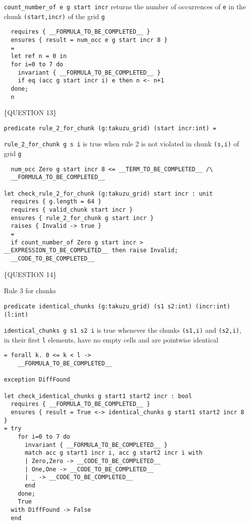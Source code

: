 \texttt{count\_number\_of\ e\ g\ start\ incr} returns the number of
occurrences of \texttt{e} in the chunk \texttt{(start,incr)} of the grid
\texttt{g}

\begin{verbatim}
  requires { __FORMULA_TO_BE_COMPLETED__ }
  ensures { result = num_occ e g start incr 8 }
  =
  let ref n = 0 in
  for i=0 to 7 do
    invariant { __FORMULA_TO_BE_COMPLETED__ }
    if eq (acc g start incr i) e then n <- n+1
  done;
  n
\end{verbatim}

\{QUESTION 13\}

\begin{verbatim}
predicate rule_2_for_chunk (g:takuzu_grid) (start incr:int) =
\end{verbatim}

\texttt{rule\_2\_for\_chunk\ g\ s\ i} is true when rule 2 is not
violated in chunk \texttt{(s,i)} of grid \texttt{g}

\begin{verbatim}
  num_occ Zero g start incr 8 <= __TERM_TO_BE_COMPLETED__ /\
  __FORMULA_TO_BE_COMPLETED__

let check_rule_2_for_chunk (g:takuzu_grid) start incr : unit
  requires { g.length = 64 }
  requires { valid_chunk start incr }
  ensures { rule_2_for_chunk g start incr }
  raises { Invalid -> true }
  =
  if count_number_of Zero g start incr > __EXPRESSION_TO_BE_COMPLETED__ then raise Invalid;
  __CODE_TO_BE_COMPLETED__
\end{verbatim}

\{QUESTION 14\}

Rule 3 for chunks

\begin{verbatim}
predicate identical_chunks (g:takuzu_grid) (s1 s2:int) (incr:int) (l:int)
\end{verbatim}

\texttt{identical\_chunks\ g\ s1\ s2\ i} is true whenever the chunks
\texttt{(s1,i)} and \texttt{(s2,i)}, in their first \texttt{l} elements,
have no empty cells and are pointwise identical

\begin{verbatim}
= forall k. 0 <= k < l ->
    __FORMULA_TO_BE_COMPLETED__

exception DiffFound

let check_identical_chunks g start1 start2 incr : bool
  requires { __FORMULA_TO_BE_COMPLETED__ }
  ensures { result = True <-> identical_chunks g start1 start2 incr 8 }
= try
    for i=0 to 7 do
      invariant { __FORMULA_TO_BE_COMPLETED__ }
      match acc g start1 incr i, acc g start2 incr i with
      | Zero,Zero -> __CODE_TO_BE_COMPLETED__
      | One,One -> __CODE_TO_BE_COMPLETED__
      | _ -> __CODE_TO_BE_COMPLETED__
      end
    done;
    True
  with DiffFound -> False
  end
\end{verbatim}

